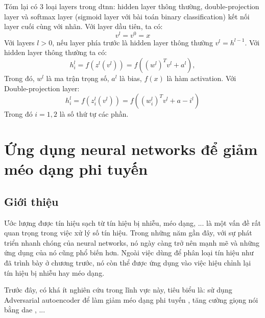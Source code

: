 Tóm lại có 3 loại layers trong \ac{dtnn}: hidden layer thông thường, double-projection layer và softmax layer (sigmoid layer với bài toán binary classification) kết nối layer cuối cùng với nhãn. Với layer dầu tiên, ta có:
\begin{equation}
v^l = v^0 = x
\end{equation}
Với layers $l > 0$, nếu layer phía trước là hidden layer thông thường $v^l = h^{l-1}$. Với hidden layer thông thường ta có:
\begin{equation}
h_i^l = f(z^l(v^l)) = f((w^l)^Tv^l + a^l), 
\end{equation}
Trong đó, $w^l$ là ma trận trọng số, $a^l$ là bias, $f(x)$ là hàm activation.
Với Double-projection layer:
\begin{equation}
h_i^l = f(z_i^l(v^l)) = f((w_i^l)^Tv^l + a-i^l)
\end{equation}
Trong đó $i = {1, 2}$ là số thứ tự các phần.
\section{Ứng dụng neural networks để giảm méo dạng phi tuyến}
\subsection{Giới thiệu}

Ước lượng được tín hiệu sạch từ tín hiệu bị nhiễu, méo dạng, ... là một vấn đề rất quan trọng trong việc xử lý số tín hiệu. Trong những năm gần đây, với sự phát triển nhanh chóng của neural networks, nó ngày càng trở nên mạnh mẽ và những ứng dụng của nó cũng phổ biến hơn. Ngoài việc dùng để phân loại tín hiệu như đã trình bày ở chương trước, nó còn thể được ứng dụng vào việc hiệu chỉnh lại tín hiệu bị nhiễu hay méo dạng.

Trước đây, có khá ít nghiên cứu trong lĩnh vực này, tiêu biểu là: sử dụng Adversarial autoencoder để làm giảm méo dạng phi tuyến \cite{segan}, tăng cường giọng nói bằng \ac{dae} \cite{se_dae}, ...


